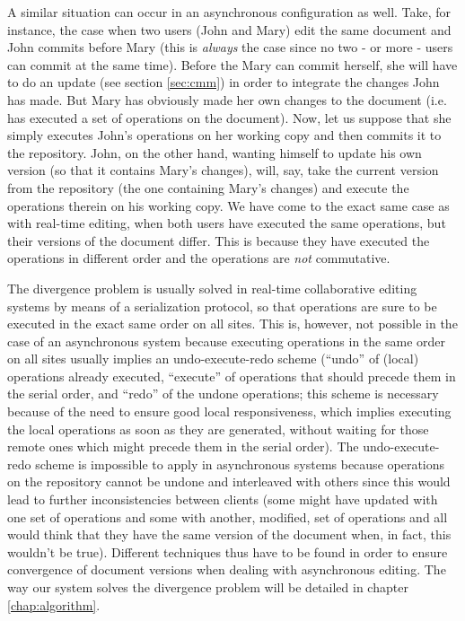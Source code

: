 A similar situation can occur in an asynchronous configuration as well. Take, for
instance, the case when two users (John and Mary) edit the same document and John
commits before Mary (this is \emph{always} the case since no two - or more - users
can commit at the same time). Before the Mary can commit herself, she will have
to do an update (see section \ref{sec:cmm}) in order to integrate the changes 
John has made. But Mary has obviously made her own changes to the document
(i.e. has executed a set of operations on the document). Now, let us suppose that
she simply executes John's operations on her working copy and then commits it
to the repository. John, on the other hand, wanting himself to update his own
version (so that it contains Mary's changes), will, say, take the current
version from the repository (the one containing Mary's changes) and execute
the operations therein on his working copy. We have come to the exact same case
as with real-time editing, when both users have executed the same operations,
but their versions of the document differ. This is because they have executed
the operations in different order and the operations are \emph{not} commutative.

The divergence problem is usually solved in real-time collaborative editing systems
by means of a serialization protocol, so that operations are sure to be executed
in the exact same order on all sites. This is, however, not possible in the case
of an asynchronous system because executing operations in the same order on all
sites usually implies an undo-execute-redo scheme (``undo'' of (local) operations already
executed, ``execute'' of operations that should precede them in the serial order,
and ``redo'' of the undone operations; this scheme is necessary because of the need
to ensure good local responsiveness, which implies executing the local operations
as soon as they are generated, without waiting for those remote ones which might
precede them in the serial order). The undo-execute-redo scheme is impossible to
apply in asynchronous systems because operations on the repository cannot be
undone and interleaved with others since this would lead to further inconsistencies
between clients (some might have updated with one set of operations and some with
another, modified, set of operations and all would think that they have the same
version of the document when, in fact, this wouldn't be true). Different techniques
thus have to be found in order to ensure convergence of document versions when
dealing with asynchronous editing. The way our system solves the divergence problem
will be detailed in chapter \ref{chap:algorithm}.

